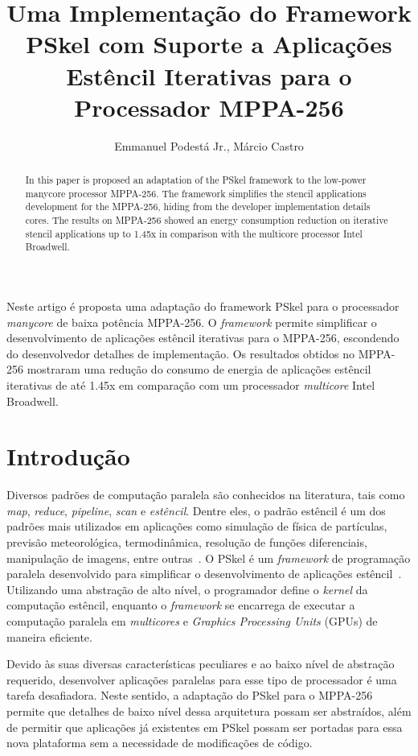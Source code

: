 \documentclass[12pt]{article}
\title{Uma Implementação do Framework PSkel com Suporte a Aplicações Estêncil
Iterativas para o Processador MPPA-256}
\author{Emmanuel Podestá Jr., Márcio Castro}
\newcommand{\fw}{\textit{framework}\xspace}
\newcommand{\pskel}{\small \textsf{PSkel}\xspace}
\newcommand{\mppa}{\small \textsf{MPPA-256}\xspace}
\begin{document}
\maketitle

\begin{abstract}
    In this paper is proposed an adaptation of the PSkel framework to the
    low-power manycore processor \mppa. The framework simplifies the stencil applications
    development for the \mppa, hiding from the developer implementation details
    cores. The results on \mppa showed an energy consumption reduction on
    iterative stencil applications up to 1.45x in comparison with the multicore
    processor Intel Broadwell.
\end{abstract}

\begin{resumo}
Neste artigo é proposta uma adaptação do framework PSkel para o processador
\textit{manycore} de baixa potência \mppa. O \fw permite simplificar o
desenvolvimento de aplicações estêncil iterativas para o \mppa, escondendo do
desenvolvedor detalhes de implementação. Os resultados obtidos no \mppa
mostraram uma redução do consumo de energia de aplicações estêncil iterativas de
até 1.45x em comparação com um processador \textit{multicore} Intel Broadwell.
\end{resumo}


\section{Introdução}

Diversos padrões de computação paralela são conhecidos na literatura, tais como
\textit{map}, \textit{reduce}, \textit{pipeline}, \textit{scan} e
\textit{estêncil}. Dentre eles, o padrão estêncil é um dos padrões mais
utilizados em aplicações como simulação de física de partículas, previsão
meteorológica, termodinâmica, resolução de funções diferenciais, manipulação de
imagens, entre outras~\cite{Rahman:2011:USC:2016604.2016641}. O \pskel é um \fw
de programação paralela desenvolvido para simplificar o desenvolvimento de
aplicações estêncil~\cite{pereira15}. Utilizando uma abstração de alto nível, o
programador define o \emph{kernel} da computação estêncil, enquanto o \fw se
encarrega de executar a computação paralela em \textit{multicores} e
\textit{Graphics Processing Units} (GPUs) de maneira eficiente.

Devido às suas diversas características peculiares e ao baixo nível de abstração
requerido, desenvolver aplicações paralelas para esse tipo de processador é uma
tarefa desafiadora. Neste sentido, a adaptação do \pskel para o \mppa permite
que detalhes de baixo nível dessa arquitetura possam ser abstraídos, além de
permitir que aplicações já existentes em \pskel possam ser portadas para essa
nova plataforma sem a necessidade de modificações de código.
\end{document}

